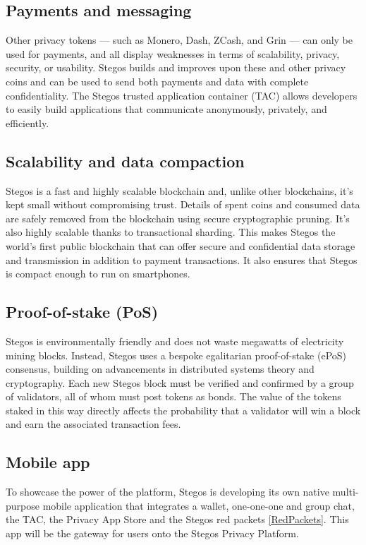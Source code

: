 \documentclass[8pt,fleqn,openany]{book}
\begin{document}
\subsection{Payments and messaging}
Other privacy tokens — such as Monero, Dash, ZCash, and Grin — can only be used for payments, and all display weaknesses in terms of scalability, privacy, security, or usability. Stegos builds and improves upon these and other privacy coins and can be used to send both payments and data with complete confidentiality. The Stegos trusted application container (TAC) allows developers to easily build applications that communicate anonymously, privately, and efficiently.

\subsection{Scalability and data compaction}
Stegos is a fast and highly scalable blockchain and, unlike other blockchains, it’s kept small without compromising trust. Details of spent coins and consumed data are safely removed from the blockchain using secure cryptographic pruning. It's also highly scalable thanks to transactional sharding. This makes Stegos the world’s first public blockchain that can offer secure and confidential data storage and transmission in addition to payment transactions. It also ensures that Stegos is compact enough to run on smartphones.

\subsection{Proof-of-stake (PoS)}
Stegos is environmentally friendly and does not waste megawatts of electricity mining blocks. Instead, Stegos uses a bespoke egalitarian proof-of-stake (ePoS) consensus, building on advancements in distributed systems theory and cryptography. Each new Stegos block must be verified and confirmed by a group of validators, all of whom must post tokens as bonds. The value of the tokens staked in this way directly affects the probability that a validator will win a block and earn the associated transaction fees.

\subsection{Mobile app}
To showcase the power of the platform, Stegos is developing its own native multi-purpose mobile application that integrates a wallet, one-one-one and group chat, the TAC, the Privacy App Store and the Stegos red packets \ref{RedPackets}. This app will be the gateway for users onto the Stegos Privacy Platform.
\end{document}
